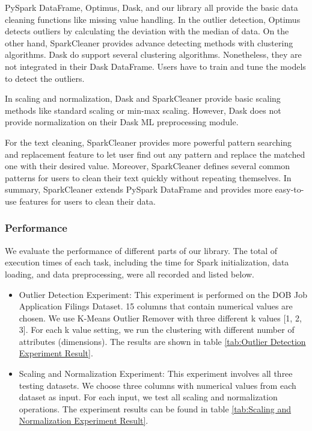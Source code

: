 \documentclass[sigconf]{acmart}
\begin{document}
PySpark DataFrame, Optimus, Dask, and our library all provide the basic data cleaning functions like missing value handling. In the outlier detection, Optimus detects outliers by calculating the deviation with the median of data. On the other hand, SparkCleaner provides advance detecting methods with clustering algorithms. Dask do support several clustering algorithms. Nonetheless, they are not integrated in their Dask DataFrame. Users have to train and tune the models to detect the outliers.

In scaling and normalization, Dask and SparkCleaner provide basic scaling methods like standard scaling or min-max scaling. However, Dask does not provide normalization on their Dask ML preprocessing module.

For the text cleaning, SparkCleaner provides more powerful pattern searching and replacement feature to let user find out any pattern and replace the matched one with their desired value. Moreover, SparkCleaner defines several common patterns for users to clean their text quickly without repeating themselves. In summary, SparkCleaner extends PySpark DataFrame and provides more easy-to-use features for users to clean their data.

\subsubsection{Performance} We evaluate the performance of different parts of our library. The total of execution times of each task, including the time for Spark initialization, data loading, and data preprocessing, were all recorded and listed below.
\begin{itemize}
	\item{Outlier Detection Experiment}: This experiment is performed on the DOB Job Application Filings Dataset. 15 columns that contain numerical values are chosen. We use K-Means Outlier Remover with three different k values [1, 2, 3]. For each k value setting, we run the clustering with different number of attributes (dimensions). The results are shown in table \ref{tab:Outlier Detection Experiment Result}.
	\item{Scaling and Normalization Experiment}: This experiment involves all three testing datasets. We choose three columns with numerical values from each dataset as input. For each input, we test all scaling and normalization operations. The experiment results can be found in table \ref{tab:Scaling and Normalization Experiment Result}.
\end{itemize}
\end{document}
